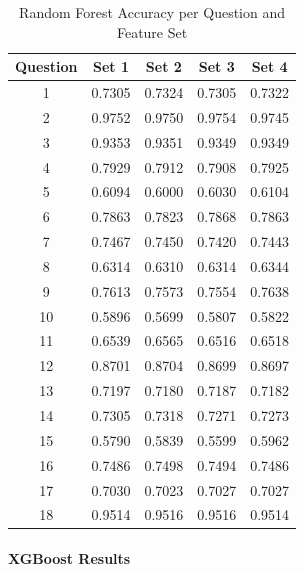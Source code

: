 \documentclass[12pt]{article}
\begin{document}
\begin{table}[H]
\centering
\small
\caption{Random Forest Accuracy per Question and Feature Set}
\begin{tabular}{c|cccc}
\toprule
\textbf{Question} & \textbf{Set 1} & \textbf{Set 2} & \textbf{Set 3} & \textbf{Set 4} \\
\midrule
1  & 0.7305 & 0.7324 & 0.7305 & 0.7322 \\
2  & 0.9752 & 0.9750 & 0.9754 & 0.9745 \\
3  & 0.9353 & 0.9351 & 0.9349 & 0.9349 \\
4  & 0.7929 & 0.7912 & 0.7908 & 0.7925 \\
5  & 0.6094 & 0.6000 & 0.6030 & 0.6104 \\
6  & 0.7863 & 0.7823 & 0.7868 & 0.7863 \\
7  & 0.7467 & 0.7450 & 0.7420 & 0.7443 \\
8  & 0.6314 & 0.6310 & 0.6314 & 0.6344 \\
9  & 0.7613 & 0.7573 & 0.7554 & 0.7638 \\
10 & 0.5896 & 0.5699 & 0.5807 & 0.5822 \\
11 & 0.6539 & 0.6565 & 0.6516 & 0.6518 \\
12 & 0.8701 & 0.8704 & 0.8699 & 0.8697 \\
13 & 0.7197 & 0.7180 & 0.7187 & 0.7182 \\
14 & 0.7305 & 0.7318 & 0.7271 & 0.7273 \\
15 & 0.5790 & 0.5839 & 0.5599 & 0.5962 \\
16 & 0.7486 & 0.7498 & 0.7494 & 0.7486 \\
17 & 0.7030 & 0.7023 & 0.7027 & 0.7027 \\
18 & 0.9514 & 0.9516 & 0.9516 & 0.9514 \\
\bottomrule
\end{tabular}
\label{tab:rf_metrics}
\end{table}

\paragraph{XGBoost Results}\mbox{}\\
\end{document}
